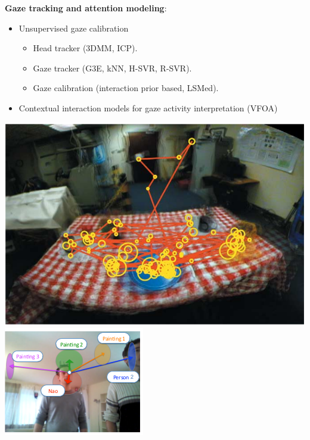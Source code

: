 \documentclass{beamer}
\begin{document}
\begin{frame}
\textbf{Gaze tracking and attention modeling}:
\begin{itemize}
\item Unsupervised gaze calibration
\begin{itemize}
\item Head tracker (3DMM, ICP).
\item Gaze tracker (G3E, kNN, H-SVR, R-SVR).
\item Gaze calibration (interaction prior based, LSMed).
\end{itemize}
\item Contextual interaction models for gaze activity interpretation (VFOA)
\end{itemize}
\begin{center}
\includegraphics[scale=0.2]{Pictures/VFOA_Sandwich.png} \hspace{0.5cm}
\includegraphics[scale=0.55]{Pictures/VFOA_Vernissage.png}
\end{center}
\end{frame}
\end{document}
